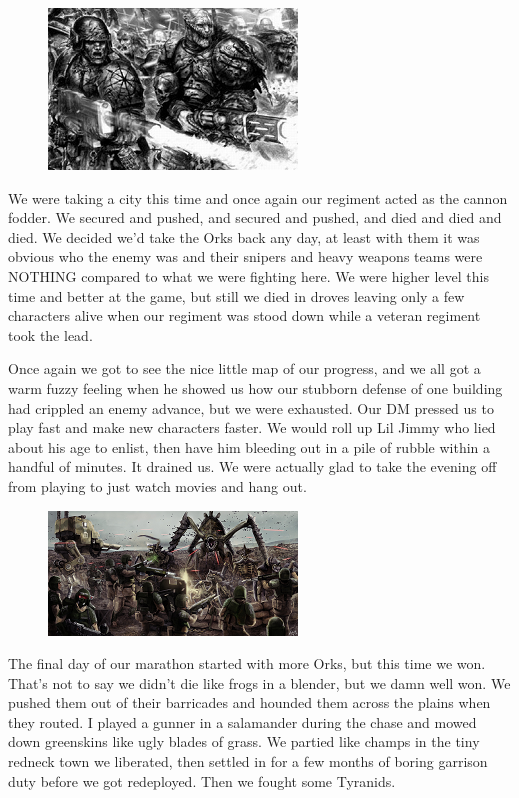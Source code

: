 \begin{figure}
	\begin{center}
		\includegraphics[width=\figwidth]{pics/1/5.png}
	\end{center}
\end{figure}
We were taking a city this time and once again our regiment acted as the cannon fodder.
We secured and pushed, and secured and pushed, and died and died and died.
We decided we'd take the Orks back any day, at least with them it was obvious who the enemy was and their snipers and heavy weapons teams were NOTHING compared to what we were fighting here.
We were higher level this time and better at the game, but still we died in droves leaving only a few characters alive when our regiment was stood down while a veteran regiment took the lead.

Once again we got to see the nice little map of our progress, and we all got a warm fuzzy feeling when he showed us how our stubborn defense of one building had crippled an enemy advance, but we were exhausted.
Our DM pressed us to play fast and make new characters faster. 
We would roll up Lil Jimmy who lied about his age to enlist, then have him bleeding out in a pile of rubble within a handful of minutes. 
It drained us. 
We were actually glad to take the evening off from playing to just watch movies and hang out.

\begin{figure}
	\begin{center}
		\includegraphics[width=\figwidth]{pics/1/6.png}
	\end{center}
\end{figure}
The final day of our marathon started with more Orks, but this time we won. That's not to say we didn't die like frogs in a blender, but we damn well won. We pushed them out of their barricades and hounded them across the plains when they routed. I played a gunner in a salamander during the chase and mowed down greenskins like ugly blades of grass. We partied like champs in the tiny redneck town we liberated, then settled in for a few months of boring garrison duty before we got redeployed. Then we fought some Tyranids.

